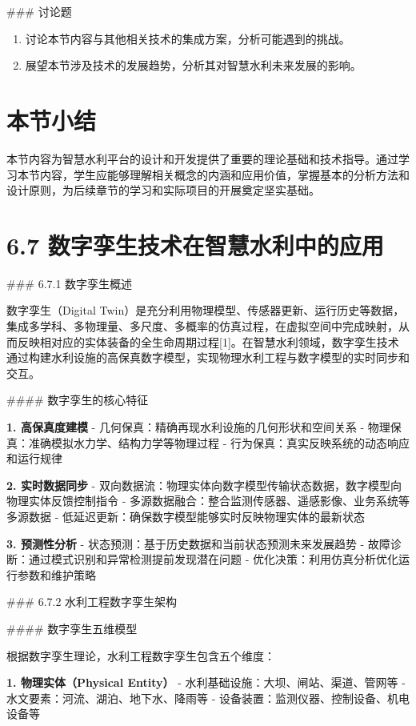 \#\#\# 讨论题

\begin{enumerate}
\def\labelenumi{\arabic{enumi}.}
\setcounter{enumi}{6}
\tightlist
\item
  讨论本节内容与其他相关技术的集成方案，分析可能遇到的挑战。
\item
  展望本节涉及技术的发展趋势，分析其对智慧水利未来发展的影响。
\end{enumerate}

\section{本节小结}

本节内容为智慧水利平台的设计和开发提供了重要的理论基础和技术指导。通过学习本节内容，学生应能够理解相关概念的内涵和应用价值，掌握基本的分析方法和设计原则，为后续章节的学习和实际项目的开展奠定坚实基础。

\section{6.7 数字孪生技术在智慧水利中的应用}

\#\#\# 6.7.1 数字孪生概述

数字孪生（Digital Twin）是充分利用物理模型、传感器更新、运行历史等数据，集成多学科、多物理量、多尺度、多概率的仿真过程，在虚拟空间中完成映射，从而反映相对应的实体装备的全生命周期过程{[}1{]}。在智慧水利领域，数字孪生技术通过构建水利设施的高保真数字模型，实现物理水利工程与数字模型的实时同步和交互。

\#\#\#\# 数字孪生的核心特征

\textbf{1. 高保真度建模} - 几何保真：精确再现水利设施的几何形状和空间关系 - 物理保真：准确模拟水力学、结构力学等物理过程 - 行为保真：真实反映系统的动态响应和运行规律

\textbf{2. 实时数据同步} - 双向数据流：物理实体向数字模型传输状态数据，数字模型向物理实体反馈控制指令 - 多源数据融合：整合监测传感器、遥感影像、业务系统等多源数据 - 低延迟更新：确保数字模型能够实时反映物理实体的最新状态

\textbf{3. 预测性分析} - 状态预测：基于历史数据和当前状态预测未来发展趋势 - 故障诊断：通过模式识别和异常检测提前发现潜在问题 - 优化决策：利用仿真分析优化运行参数和维护策略

\#\#\# 6.7.2 水利工程数字孪生架构

\#\#\#\# 数字孪生五维模型

根据数字孪生理论，水利工程数字孪生包含五个维度：

\textbf{1. 物理实体（Physical Entity）} - 水利基础设施：大坝、闸站、渠道、管网等 - 水文要素：河流、湖泊、地下水、降雨等 - 设备装置：监测仪器、控制设备、机电设备等

